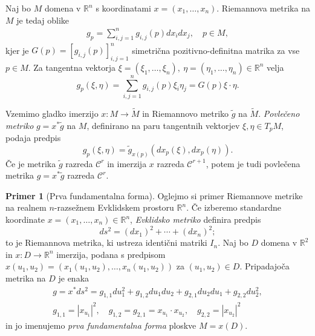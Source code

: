 \documentclass[12pt,a4paper,twoside]{article}
\theoremstyle{definition} %
\newtheorem{primer}[definicija]{Primer}
\theoremstyle{plain} %
\numberwithin{equation}{section}  %
\newcommand{\R}{\mathbb R}
\begin{document}
Naj bo $M$ domena v $\R^{n}$ s koordinatami $x = (x_{1}, \dots, x_{n})$. Riemannova metrika na $M$ je tedaj oblike
\begin{gather}
g_{p} = \sum_{i,j=1}^{n} g_{i,j}(p) dx_{i} dx_{j}, \quad p \in M,
\end{gather}
kjer je $G(p) = [g_{i,j}(p)]_{i,j=1}^{n}$ simetrična pozitivno-definitna matrika za vse $p \in M$. Za tangentna vektorja $\xi = (\xi_{1}, \dots, \xi_{n}), \ \eta = (\eta_{1}, \dots, \eta_{n}) \in \R^{n}$ velja
\begin{equation}
g_{p}(\xi, \eta) = \sum_{i,j=1}^{n} g_{i,j}(p) \xi_{i} \eta_{j} = G(p) \xi \cdot \eta.
\end{equation}

Vzemimo gladko imerzijo $x \colon M \to \widetilde{M}$ in Riemannovo metriko $\tilde{g}$ na $\widetilde{M}$. \emph{Povlečeno metriko} $g = x^{*} \tilde{g}$ na $M$, definirano na paru tangentnih vektorjev $\xi, \eta \in T_{p}M$, podaja predpis
\begin{equation} \label{eq:pullback-metrika}
g_{p}(\xi, \eta) = \tilde{g}_{x(p)} (dx_{p}(\xi), dx_{p}(\eta)).
\end{equation}
Če je metrika $\tilde{g}$ razreda $\mathcal{C}^{r}$ in imerzija $x$ razreda $\mathcal{C}^{r+1}$, potem je tudi povlečena metrika $g = x^{*} \tilde{g}$ razreda $\mathcal{C}^{r}$.

\begin{primer} [Prva fundamentalna forma]
Oglejmo si primer Riemannove metrike na realnem $n$-razsežnem Evklidskem prostoru $\mathbb{R}^{n}$.
Če izberemo standardne koordinate $x = (x_{1}, \dots, x_{n}) \in \mathbb{R}^{n}$, \emph{Evklidsko metriko} definira predpis
\begin{equation}
ds^2 = (dx_{1})^2 + \cdots + (dx_{n})^2;
\end{equation}
to je Riemannova metrika, ki ustreza identični matriki $I_{n}$. Naj bo $D$ domena v $\R^2$ in $x \colon D \to \R^{n}$ imerzija, podana s predpisom $x(u_1,u_2) = (x_{1}(u_1,u_2), \dots, x_{n}(u_1,u_2))$ za $(u_1,u_2) \in D$. Pripadajoča metrika na $D$ je enaka
\begin{gather*}
g = x^{*}ds^2 = g_{1,1}du_{1}^2 + g_{1,2}du_{1}du_{2} + g_{2,1}du_{2}du_{1} + g_{2,2}du_{2}^2, \\
g_{1,1} = |x_{u_1}|^2, \quad g_{1,2} = g_{2,1} = x_{u_1} \cdot x_{u_2}, \quad g_{2,2} = |x_{u_2}|^2
\end{gather*}
in jo imenujemo \emph{prva fundamentalna forma} ploskve $M = x(D)$.
\end{primer}
\end{document}
